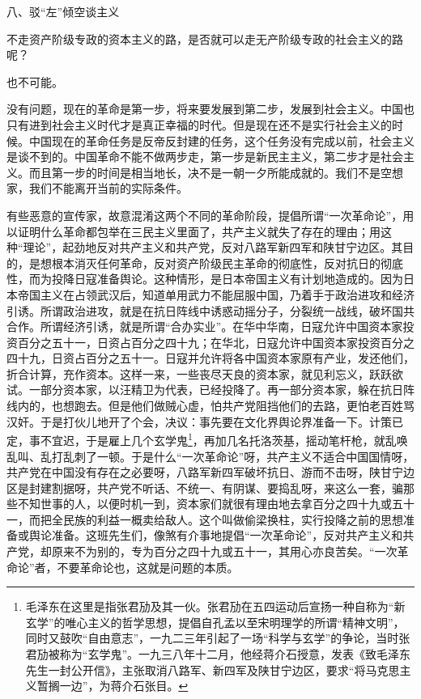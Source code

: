 \documentclass[UTF8, 12pt, a4paper]{ctexrep}
\begin{document}
八、驳“左”倾空谈主义

不走资产阶级专政的资本主义的路，是否就可以走无产阶级专政的社会主义的路呢？

也不可能。

没有问题，现在的革命是第一步，将来要发展到第二步，发展到社会主义。中国也只有进到社会主义时代才是真正幸福的时代。但是现在还不是实行社会主义的时候。中国现在的革命任务是反帝反封建的任务，这个任务没有完成以前，社会主义是谈不到的。中国革命不能不做两步走，第一步是新民主主义，第二步才是社会主义。而且第一步的时间是相当地长，决不是一朝一夕所能成就的。我们不是空想家，我们不能离开当前的实际条件。

有些恶意的宣传家，故意混淆这两个不同的革命阶段，提倡所谓“一次革命论”，用以证明什么革命都包举在三民主义里面了，共产主义就失了存在的理由；用这种“理论”，起劲地反对共产主义和共产党，反对八路军新四军和陕甘宁边区。其目的，是想根本消灭任何革命，反对资产阶级民主革命的彻底性，反对抗日的彻底性，而为投降日寇准备舆论。这种情形，是日本帝国主义有计划地造成的。因为日本帝国主义在占领武汉后，知道单用武力不能屈服中国，乃着手于政治进攻和经济引诱。所谓政治进攻，就是在抗日阵线中诱惑动摇分子，分裂统一战线，破坏国共合作。所谓经济引诱，就是所谓“合办实业”。在华中华南，日寇允许中国资本家投资百分之五十一，日资占百分之四十九；在华北，日寇允许中国资本家投资百分之四十九，日资占百分之五十一。日寇并允许将各中国资本家原有产业，发还他们，折合计算，充作资本。这样一来，一些丧尽天良的资本家，就见利忘义，跃跃欲试。一部分资本家，以汪精卫为代表，已经投降了。再一部分资本家，躲在抗日阵线内的，也想跑去。但是他们做贼心虚，怕共产党阻挡他们的去路，更怕老百姓骂汉奸。于是打伙儿地开了个会，决议：事先要在文化界舆论界准备一下。计策已定，事不宜迟，于是雇上几个玄学鬼\footnote{毛泽东在这里是指张君劢及其一伙。张君劢在五四运动后宣扬一种自称为“新玄学”的唯心主义的哲学思想，提倡自孔孟以至宋明理学的所谓“精神文明”，同时又鼓吹“自由意志”，一九二三年引起了一场“科学与玄学”的争论，当时张君劢被称为“玄学鬼”。一九三八年十二月，他经蒋介石授意，发表《致毛泽东先生一封公开信》，主张取消八路军、新四军及陕甘宁边区，要求“将马克思主义暂搁一边”，为蒋介石张目。}，再加几名托洛茨基，摇动笔杆枪，就乱唤乱叫、乱打乱刺了一顿。于是什么“一次革命论”呀，共产主义不适合中国国情呀，共产党在中国没有存在之必要呀，八路军新四军破坏抗日、游而不击呀，陕甘宁边区是封建割据呀，共产党不听话、不统一、有阴谋、要捣乱呀，来这么一套，骗那些不知世事的人，以便时机一到，资本家们就很有理由地去拿百分之四十九或五十一，而把全民族的利益一概卖给敌人。这个叫做偷梁换柱，实行投降之前的思想准备或舆论准备。这班先生们，像煞有介事地提倡“一次革命论”，反对共产主义和共产党，却原来不为别的，专为百分之四十九或五十一，其用心亦良苦矣。“一次革命论”者，不要革命论也，这就是问题的本质。
\end{document}
